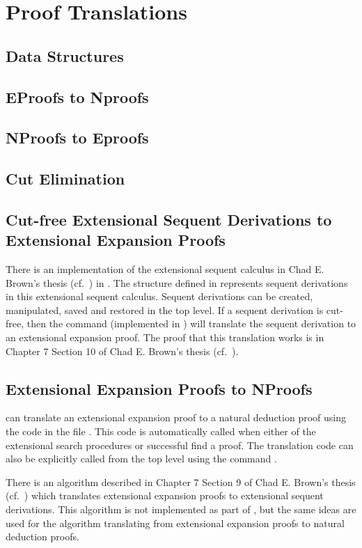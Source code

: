 \chapter{Proof Translations}
\section{Data Structures}
\section{EProofs to Nproofs}

\section{NProofs to Eproofs}

\section{Cut Elimination}

\section{Cut-free Extensional Sequent Derivations to Extensional Expansion Proofs}

There is an implementation of the extensional sequent calculus
in Chad E. Brown's thesis (cf.~\cite{Brown2004a}) in \TPS.
The structure {} defined in 
represents sequent derivations in this extensional sequent calculus.
Sequent derivations can be created, manipulated, saved and restored in 
the  top level.  If a sequent derivation is cut-free,
then the command  (implemented in )
will translate the sequent derivation to an extensional expansion proof.
The proof that this translation works is in Chapter 7 Section 10 of Chad E. Brown's thesis (cf.~\cite{Brown2004a}).

\section{Extensional Expansion Proofs to NProofs}

\TPS can translate an extensional expansion proof to a natural deduction proof
using the code in the file .
This code is automatically called when either of the extensional search procedures
 or  successful find a proof.  The translation code can also be explicitly
called from the  top level using the command .

There is an algorithm described in Chapter 7 Section 9 of Chad E. Brown's thesis (cf.~\cite{Brown2004a})
which translates extensional expansion proofs to extensional sequent derivations.
This algorithm is not implemented as part of \TPS, but the same ideas are used for
the algorithm translating from extensional expansion proofs to natural deduction proofs.

